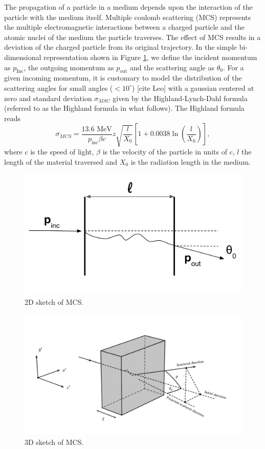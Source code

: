 \documentclass[aps,prl,twocolumn,showpacs,superscriptaddress,groupedaddress]{revtex4}  %
\begin{document}
The propagation of a particle in a medium depends upon the interaction of the particle with the medium itself.  Multiple coulomb scattering (MCS)  represents the multiple electromagnetic interactions between a charged particle and the atomic nuclei of the medium  the particle traverses. The effect of MCS results in a deviation of the charged particle from its original trajectory. 
In the simple bi-dimensional representation shown in Figure \ref{fig:MCSModel2D}, we define the incident momentum as $p_{\text{Inc}}$, the outgoing momentum as $p_{\text{out}}$ and the scattering angle as $\theta_0$.  For a given incoming momentum, it is customary  to model the distribution of the scattering angles for small angles ($< 10^\circ$) [cite Leo] with a gaussian centered at zero and standard deviation $\sigma_{MSC}$ given by the Highland-Lynch-Dahl formula (referred to as the Highland formula in what follows). The Highland formula reads 
\begin{equation}
\sigma_{MCS} = \frac{ \text{13.6 MeV}}{p_{\text{inc}}\beta c} z \sqrt{ \frac{l}{X_0}}[1 + 0.0038 \ln( \frac{l}{X_0})],
\end{equation}
where $c$ is the speed of light, $\beta$ is the velocity of the particle in units of $c$, $l$ the length of the material traversed and $X_0$ is the radiation length in the medium.
 

\begin{figure}[hbpt]
\centering
\includegraphics[scale=0.2]{MCS2D}
\caption{2D sketch of MCS.}
\label{fig:MCSModel2D}
\end{figure}

\begin{figure}[hbpt]
\centering
\includegraphics[scale=0.2]{MCS3D}
\caption{3D sketch of MCS.}
\label{fig:MCSModel3D}
\end{figure}
\end{document}
